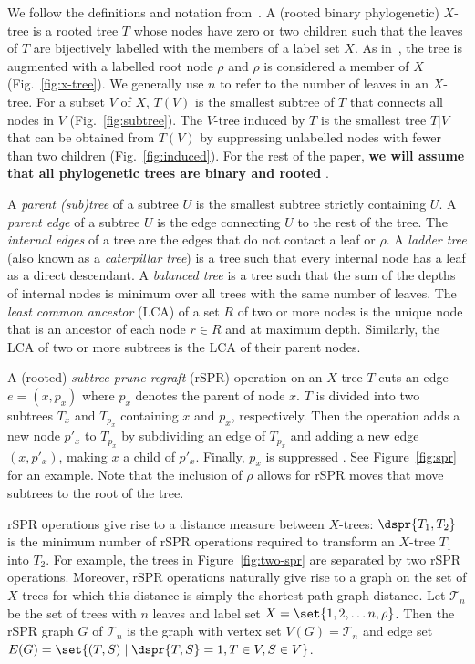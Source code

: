 \documentclass[11pt,onecolumn,conference]{IEEEtran}
\newcommand{\cuttable}[2][]{%
    \ifthenelse{\equal{#1}{}}%
		{}%
		{#1}%
}
\begin{document}
We follow the definitions and notation from~\cite{bordewich05,whidden2013hybridization, Whidden2015-yi}.
A (rooted binary phylogenetic) $X$-tree is a rooted tree $T$ whose nodes have zero or two children such that the leaves of $T$ are bijectively labelled with the members of a label set $X$.
As in~\cite{bordewich05,whidden2013hybridization,Whidden2015-yi}, the tree is augmented with a labelled root node $\rho$ and $\rho$ is considered a member of $X$ (Fig.~\ref{fig:x-tree}).
We generally use $n$ to refer to the number of leaves in an $X$-tree.
For a subset $V$ of $X$, $T(V)$ is the smallest subtree of $T$ that connects all nodes in $V$ (Fig.~\ref{fig:subtree}).
The $V$-tree induced by $T$ is the smallest tree $T|V$ that can be obtained from $T(V)$ by suppressing unlabelled nodes with fewer than two children (Fig.~\ref{fig:induced}).
For the rest of the paper, \textbf{we will assume that all phylogenetic trees are binary and rooted}\cuttable{, and thus that tree inclusion is rooted tree inclusion}.

A \emph{parent (sub)tree} of a subtree $U$ is the smallest subtree strictly containing $U$.
A \emph{parent edge} of a subtree $U$ is the edge connecting $U$ to the rest of the tree.
The \emph{internal edges} of a tree are the edges that do not contact a leaf or $\rho$.
A \emph{ladder tree} (also known as a \emph{caterpillar tree}) is a tree such that every internal node has a leaf as a direct descendant.
A \emph{balanced tree} is a tree such that the sum of the depths of internal nodes is minimum over all trees with the same number of leaves.
The \emph{least common ancestor} (LCA) of a set $R$ of two or more nodes is the unique node that is an ancestor of each node $r \in R$ and at maximum depth.
Similarly, the LCA of two or more subtrees is the LCA of their parent nodes.

A (rooted) \emph{subtree-prune-regraft} (rSPR) operation on an $X$-tree $T$ cuts an edge $e = (x, p_x)$ where $p_x$ denotes the parent of node $x$.
$T$ is divided into two subtrees $T_x$ and $T_{p_x}$ containing $x$ and $p_x$, respectively.
Then the operation adds a new node $p'_x$ to $T_{p_x}$ by subdividing an edge of $T_{p_x}$ and adding a new edge $(x, p'_x)$, making $x$ a child of $p'_x$.
Finally, $p_x$ is suppressed\cuttable{, joining the two edges on either side of that node}.
See Figure~\ref{fig:spr} for an example.
Note that the inclusion of $\rho$ allows for rSPR moves that move subtrees to the root of the tree.

rSPR operations give rise to a distance measure between $X$-trees: $\dspr{T_1, T_2}$ is the minimum number of rSPR operations required to transform an $X$-tree $T_1$ into $T_2$.
For example, the trees in Figure~\ref{fig:two-spr} are separated by two rSPR operations.
Moreover, rSPR operations naturally give rise to a graph on the set of $X$-trees for which this distance is simply the shortest-path graph distance.
Let $\mathcal{T}_n$ be the set of trees with $n$ leaves and label set $X = \set{1, 2, \ldots n, \rho}$.
Then the rSPR graph $G$ of $\mathcal{T}_n$ is the graph with vertex set $V(G) = \mathcal{T}_n$ and edge set $E(G) = \set{(T,S) \mid \dspr{T,S} = 1, T \in V, S \in V}$.
\end{document}

